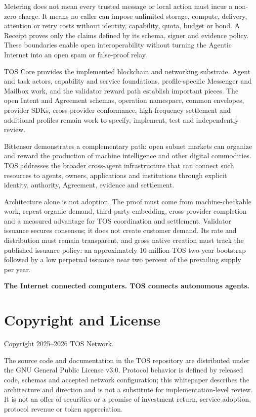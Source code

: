 \documentclass[11pt,oneside]{article}
\begin{document}
Metering does not mean every trusted message or local action must incur a non-zero charge. It
means no caller can impose unlimited storage, compute, delivery, attention or retry costs
without identity, capability, quota, budget or bond. A Receipt proves only the claims defined
by its schema, signer and evidence policy. These boundaries enable open interoperability
without turning the Agentic Internet into an open spam or false-proof relay.

TOS Core provides the implemented blockchain and networking substrate. Agent and task actors,
capability and service foundations, profile-specific Messenger and Mailbox work, and the
validator reward path establish important pieces. The open Intent and Agreement schemas,
operation namespace, common envelopes, provider SDKs, cross-provider conformance,
high-frequency settlement and additional profiles remain work to specify, implement, test
and independently review.

Bittensor demonstrates a complementary path: open subnet markets can organize and reward the
production of machine intelligence and other digital commodities. TOS addresses the broader
cross-agent infrastructure that can connect such resources to agents, owners, applications
and institutions through explicit identity, authority, Agreement, evidence and settlement.

Architecture alone is not adoption. The proof must come from machine-checkable work, repeat
organic demand, third-party embedding, cross-provider completion and a measured advantage for
TOS coordination and settlement. Validator issuance secures consensus; it does not create
customer demand. Its rate and distribution must remain transparent, and gross native creation
must track the published issuance policy: an approximately 10-million-TOS two-year bootstrap
followed by a low perpetual issuance near two percent of the prevailing supply per year.

\begin{center}
\textbf{The Internet connected computers. TOS connects autonomous agents.}
\end{center}
\section*{Copyright and License}

Copyright \textcopyright{} 2025--2026 TOS Network.

The source code and documentation in the TOS repository are distributed under the GNU General
Public License v3.0. Protocol behavior is defined by released code, schemas and accepted
network configuration; this whitepaper describes the architecture and direction and is not a
substitute for implementation-level review. It is not an offer of securities or a promise of
investment return, service adoption, protocol revenue or token appreciation.
\end{document}
